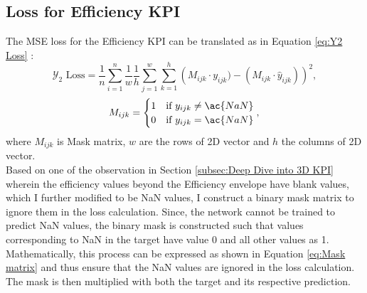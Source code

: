 \documentclass{report} %
\begin{document}
\subsection{Loss for Efficiency KPI}\label{sec:Loss for 3D KPI}

The \ac{MSE} loss for the Efficiency \ac{KPI} can be translated as in Equation \ref{eq:Y2 Loss} :
\begin{equation}
\text{$\mathcal{Y}_2$ Loss} = \frac{1}{n} \sum_{i=1}^{n} \frac{1}{w} \frac{1}{h} \sum_{j=1}^{w} \sum_{k=1}^{h} \left( M_{ijk} \cdot y_{ijk}) - (M_{ijk} \cdot \hat{y}_{ijk})\right)^2,
\label{eq:Y2 Loss}
\end{equation}
\begin{equation}
    M_{ijk} = \begin{cases}
        1 & \text{if } y_{ijk} \neq \ac{NaN} \\
        0 & \text{if } y_{ijk} = \ac{NaN} 
\end{cases} ,\\
\label{eq:Mask matrix}
\end{equation}
where \(M_{ijk}\) is Mask matrix, \(w\) are the rows of 2\ac{D} vector and \(h\) the columns of 2\ac{D} vector.\\
Based on one of the observation in Section \ref{subsec:Deep Dive into 3D KPI} wherein the efficiency values beyond the Efficiency envelope have blank values, 
which I further modified to be \ac{NaN} values, I construct a binary mask matrix to ignore them in the loss calculation.
Since, the network cannot be trained to predict \ac{NaN} values, the binary mask is constructed such that values corresponding to \ac{NaN} in the target have value 0 and all other values as 1.
Mathematically, this process can be expressed as shown in Equation \ref{eq:Mask matrix} and thus ensure that the \ac{NaN} values are ignored in the loss calculation. 
The mask is then multiplied with both the target and its respective prediction. \\
\end{document}
